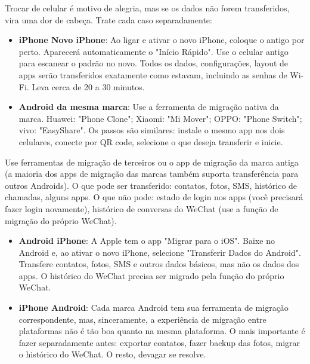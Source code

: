 
Trocar de celular é motivo de alegria, mas se os dados não forem transferidos, vira uma dor de cabeça. Trate cada caso separadamente:


\begin{itemize}
  \item \textbf{iPhone Novo iPhone}: Ao ligar e ativar o novo iPhone, coloque o antigo por perto. Aparecerá automaticamente o "Início Rápido". Use o celular antigo para escanear o padrão no novo. Todos os dados, configurações, layout de apps serão transferidos exatamente como estavam, incluindo as senhas de Wi-Fi. Leva cerca de 20 a 30 minutos.
  \item \textbf{Android da mesma marca}: Use a ferramenta de migração nativa da marca. Huawei: "Phone Clone"; Xiaomi: "Mi Mover"; OPPO: "Phone Switch"; vivo: "EasyShare". Os passos são similares: instale o mesmo app nos dois celulares, conecte por QR code, selecione o que deseja transferir e inicie.
\end{itemize}


Use ferramentas de migração de terceiros ou o app de migração da marca antiga (a maioria dos apps de migração das marcas também suporta transferência para outros Androids). O que pode ser transferido: contatos, fotos, SMS, histórico de chamadas, alguns apps. O que não pode: estado de login nos apps (você precisará fazer login novamente), histórico de conversas do WeChat (use a função de migração do próprio WeChat).


\begin{itemize}
  \item \textbf{Android iPhone}: A Apple tem o app "Migrar para o iOS". Baixe no Android e, ao ativar o novo iPhone, selecione "Transferir Dados do Android". Transfere contatos, fotos, SMS e outros dados básicos, mas não os dados dos apps. O histórico do WeChat precisa ser migrado pela função do próprio WeChat.
  \item \textbf{iPhone Android}: Cada marca Android tem sua ferramenta de migração correspondente, mas, sinceramente, a experiência de migração entre plataformas não é tão boa quanto na mesma plataforma. O mais importante é fazer separadamente antes: exportar contatos, fazer backup das fotos, migrar o histórico do WeChat. O resto, devagar se resolve.
\end{itemize}

